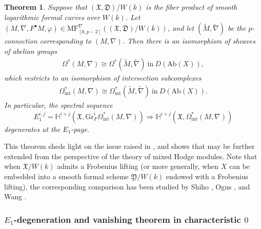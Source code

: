 \documentclass[12pt, a4paper]{article}
\newtheorem{theorem}{Theorem}[section]
\begin{document}
\begin{theorem}
 Suppose that $(\mathfrak X,\mathfrak D)/W(k)$ is the fiber product of smooth logarithmic formal curves over $W(k)$. Let $(M, \nabla, F^\bullet M, \varphi) \in \mathrm{MF}^\nabla_{[0,p-2]}((\mathfrak{X}, \mathfrak{D})/W(k))$, and let $(\tilde{M}, \tilde{\nabla})$ be the $p$-connection corresponding to $(M, \nabla)$. Then there is an isomorphism of sheaves of abelian groups
 \begin{eqnarray}\label{De-Hig mod p^n}
\Omega^*(M,\nabla)\cong\Omega^*(\tilde M,\tilde\nabla)~\mathrm{in}~D(\mathrm{Ab}(X)),
 \end{eqnarray}
 which restricts to an isomorphism of intersection subcomplexes
 \begin{eqnarray}\label{De-Hig mod p^n int}
\Omega_\mathrm{int}^*(M,\nabla)\cong\Omega_\mathrm{int}^*(\tilde M,\tilde\nabla)~\mathrm{in}~D(\mathrm{Ab}(X)).
 \end{eqnarray}
 In particular, the spectral sequence
\[
E_1^{i,j} = \mathbb{H}^{i+j}(\mathfrak{X}, \mathrm{Gr}_F^i \Omega_\mathrm{int}^*(M, \nabla)) \Rightarrow \mathbb{H}^{i+j}(\mathfrak{X}, \Omega_\mathrm{int}^*(M, \nabla))
\]
degenerates at the $E_1$-page.
\end{theorem}
This theorem sheds light on the issue raised in \cite[Remark 14.19]{X}, and shows that \cite[Theorem 5.6]{Fa} may be further extended from the perspective of the theory of mixed Hodge modules. Note that when $\mathfrak{X}/W(k)$ admits a Frobenius lifting (or more generally, when $X$ can be embedded into a smooth formal scheme $\mathfrak{Y}/W(k)$ endowed with a Frobenius lifting), the corresponding comparison has been studied by Shiho \cite{Shi}, Ogus \cite{O24}, and Wang \cite{W}.

\subsubsection{$E_1$-degeneration and vanishing theorem in characteristic $0$}
\end{document}
